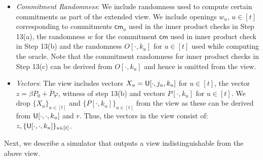 \begin{itemize}[\leftmargin=0pt]
\item {\em Commitment Randomness}: We include randomness used to compute certain
commitments as part of the extended view. We include openings $w_u$, $u\in [t]$
corresponding to commitments $\mathsf{cm}_u$ used in the inner product checks in
Step 13(a), the randomness $w$ for the commitment $\mathsf{cm}$ used in inner
product check in Step 13(b) and the randomness $O[\cdot,k_u]$ for $u\in [t]$
used while computing the oracle. Note that the commitment randomness for inner
product checks in Step 13(c) can be derived from $O[\cdot,k_u]$ and hence is
omitted from the view.

\item {\em Vectors}: The view includes vectors
$X_u=\mathsf{U}[\cdot,j_u,k_u]$ for $u\in [t]$, the vector $z = \beta P_0 +
\overline{P} \varphi$, witness of step 13(b) and vectors $P[\cdot, k_u]$ for
$u\in [t]$.
We drop $\{X_u\}_{u\in [t]}$ and $\{P[\cdot,k_u]\}_{u\in [t]}$ from the view as these can be derived from $\mathsf{U}[\cdot,\cdot,k_u]$ and $r$. Thus, the vectors in the view consist of: $z,\{\mathsf{U}[\cdot,\cdot,k_u]\}_{u\in [t]}$.
\end{itemize}
Next, we describe a simulator that outputs a view indistinguishable from the
above view.


